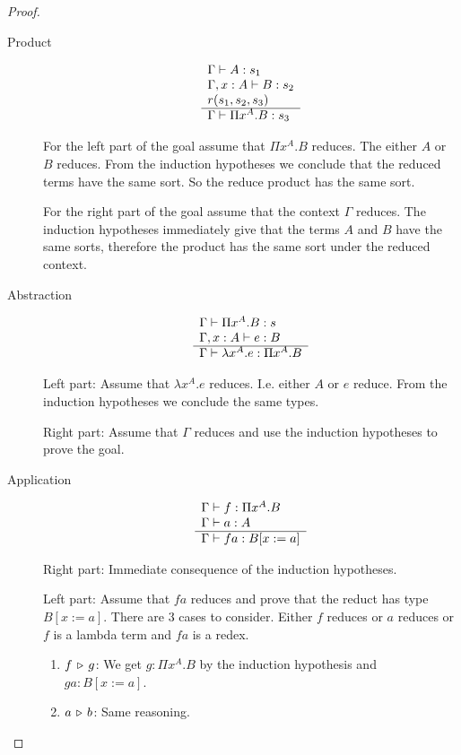\begin{theorem}
\begin{proof}
\begin{description}
    \item[Product]
      $$
      \begin{array}{l}  \Gamma \vdash A:s_1
        \\
        \Gamma,x:A \vdash B: s_2
        \\
        r(s_1,s_2,s_3) \\ \hline \Gamma \vdash \Pi x^A. B : s_3\end{array}
      $$

      For the left part of the goal assume that $\Pi x^A. B$ reduces. The
      either  $A$ or $B$ reduces. From the induction hypotheses we conclude
      that the reduced terms have the same sort. So the reduce product has the
      same sort.

      For the right part of the goal assume that the context $\Gamma$
      reduces. The induction hypotheses immediately give that the terms $A$
      and $B$ have the same sorts, therefore the product has the same sort
      under the reduced context.

    \item[Abstraction]
      $$
      \begin{array}{l}  \Gamma \vdash \Pi x^A. B : s
        \\
        \Gamma,x:A \vdash e: B
       \\ \hline \Gamma \vdash \lambda x^A. e : \Pi x^A. B\end{array}
      $$

      Left part: Assume that $\lambda x^A. e$ reduces. I.e. either $A$ or $e$
      reduce. From the induction hypotheses we conclude the same types.

      Right part: Assume that $\Gamma$ reduces and use the induction
      hypotheses to prove the goal.


    \item[Application]
      $$
      \begin{array}{l}  \Gamma \vdash f : \Pi x^A. B
        \\
        \Gamma \vdash a: A
       \\ \hline \Gamma \vdash f a : B[x:=a]\end{array}
      $$

      Right part: Immediate consequence of the induction hypotheses.

      Left part: Assume that $f a$ reduces and prove that the reduct has type
      $B[x:=a]$. There are 3 cases to consider. Either $f$ reduces or $a$
      reduces or $f$ is a lambda term and $f a$ is a redex.
      \begin{enumerate}

      \item $f \,\triangleright\, g$: We get $g: \Pi x^A. B$ by the induction hypothesis
        and $g a : B[x:=a]$.

      \item $a \,\triangleright\, b$: Same reasoning.


\end{enumerate}
\end{description}
\end{proof}
\end{theorem}
